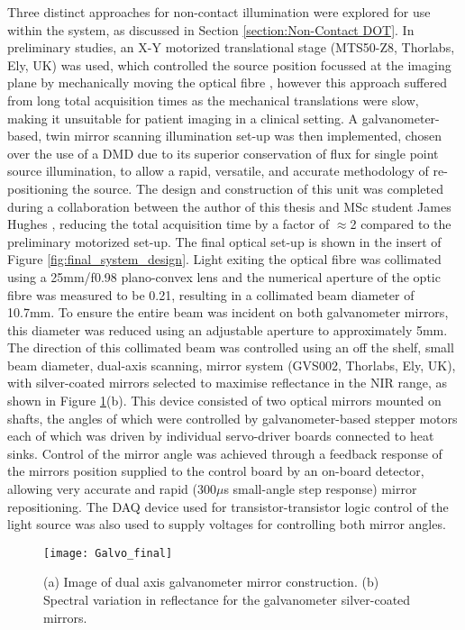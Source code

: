 \documentclass[twoside]{bhamthesis}
\theoremstyle{definition}
\begin{document}
Three distinct approaches for non-contact illumination were explored for use within the system, as discussed in Section \ref{section:Non-Contact DOT}. In preliminary studies, an X-Y motorized translational stage (MTS50-Z8, Thorlabs, Ely, UK) was used, which controlled the source position focussed at the imaging plane by mechanically moving the optical fibre \cite{lighter2016assessing}, however this approach suffered from long total acquisition times as the mechanical translations were slow, making it unsuitable for patient imaging in a clinical setting. A galvanometer-based, twin mirror scanning illumination set-up was then implemented, chosen over the use of a DMD due to its superior conservation of flux for single point source illumination, to allow a rapid, versatile, and accurate methodology of re-positioning the source. The design and construction of this unit was completed during a collaboration between the author of this thesis and MSc student James Hughes \cite{lighter2018multispectral}, reducing the total acquisition time by a factor of $\approx$2 compared to the preliminary motorized set-up. The final optical set-up is shown in the insert of Figure \ref{fig:final_system_design}. Light exiting the optical fibre was collimated using a 25mm/f0.98 plano-convex lens and the numerical aperture of the optic fibre was measured to be 0.21, resulting in a collimated beam diameter of 10.7mm. To ensure the entire beam was incident on both galvanometer mirrors, this diameter was reduced using an adjustable aperture to approximately 5mm. The direction of this collimated beam was controlled using an off the shelf, small beam diameter, dual-axis scanning, mirror system (GVS002, Thorlabs, Ely, UK), with silver-coated mirrors selected to maximise reflectance in the NIR range, as shown in Figure \ref{galvo}(b). This device consisted of two optical mirrors mounted on shafts, the angles of which were controlled by galvanometer-based stepper motors each of which was driven by individual servo-driver boards connected to heat sinks. Control of the mirror angle was achieved through a feedback response of the mirrors position supplied to the control board by an on-board detector, allowing very accurate and rapid (300$\mu$s small-angle step response) mirror repositioning. The DAQ device used for transistor-transistor logic control of the light source was also used to supply voltages for controlling both mirror angles.

\begin{figure}[!ht]
  \centering
  \texttt{[image: Galvo\_final]}
\caption{(a) Image of dual axis galvanometer mirror construction. (b) Spectral variation in reflectance for the galvanometer silver-coated mirrors.}
\label{galvo}
\end{figure}
\end{document}
